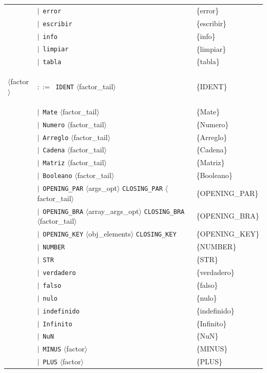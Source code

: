 \documentclass[10pt]{article}
\begin{document}
{\begin{longtable}{@{} p{2.0cm} p{6.9cm} p{6.9cm} @{}}
   & $\mid$~\texttt{error} & \{error\} \\
   & $\mid$~\texttt{escribir} & \{escribir\} \\
   & $\mid$~\texttt{info} & \{info\} \\
   & $\mid$~\texttt{limpiar} & \{limpiar\} \\
   & $\mid$~\texttt{tabla} & \{tabla\} \\
  \midrule
  \textcolor{ntcolor}{\parbox[t]{1.8cm}{\raggedright$\langle$factor$\rangle$}} & $::=$~\texttt{IDENT} $\langle$factor\_tail$\rangle$ & \{IDENT\} \\
   & $\mid$~\texttt{Mate} $\langle$factor\_tail$\rangle$ & \{Mate\} \\
   & $\mid$~\texttt{Numero} $\langle$factor\_tail$\rangle$ & \{Numero\} \\
   & $\mid$~\texttt{Arreglo} $\langle$factor\_tail$\rangle$ & \{Arreglo\} \\
   & $\mid$~\texttt{Cadena} $\langle$factor\_tail$\rangle$ & \{Cadena\} \\
   & $\mid$~\texttt{Matriz} $\langle$factor\_tail$\rangle$ & \{Matriz\} \\
   & $\mid$~\texttt{Booleano} $\langle$factor\_tail$\rangle$ & \{Booleano\} \\
   & $\mid$~\texttt{OPENING\_PAR} $\langle$args\_opt$\rangle$ \texttt{CLOSING\_PAR} $\langle$factor\_tail$\rangle$ & \{OPENING\_PAR\} \\
   & $\mid$~\texttt{OPENING\_BRA} $\langle$array\_args\_opt$\rangle$ \texttt{CLOSING\_BRA} $\langle$factor\_tail$\rangle$ & \{OPENING\_BRA\} \\
   & $\mid$~\texttt{OPENING\_KEY} $\langle$obj\_elements$\rangle$ \texttt{CLOSING\_KEY} & \{OPENING\_KEY\} \\
   & $\mid$~\texttt{NUMBER} & \{NUMBER\} \\
   & $\mid$~\texttt{STR} & \{STR\} \\
   & $\mid$~\texttt{verdadero} & \{verdadero\} \\
   & $\mid$~\texttt{falso} & \{falso\} \\
   & $\mid$~\texttt{nulo} & \{nulo\} \\
   & $\mid$~\texttt{indefinido} & \{indefinido\} \\
   & $\mid$~\texttt{Infinito} & \{Infinito\} \\
   & $\mid$~\texttt{NuN} & \{NuN\} \\
   & $\mid$~\texttt{MINUS} $\langle$factor$\rangle$ & \{MINUS\} \\
   & $\mid$~\texttt{PLUS} $\langle$factor$\rangle$ & \{PLUS\} \\

\end{longtable}}
\end{document}
